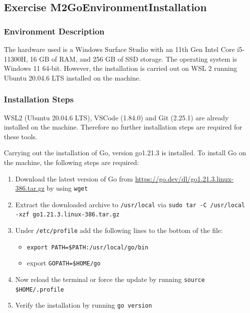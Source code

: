 \label{sec:exercise_install_go_env}

\subsection{Exercise M2GoEnvironmentInstallation}
\label{sec:exercise_m2go_environment_installation}

\subsubsection*{Environment Description}
The hardware used is a Windows Surface Studio with an 11th Gen Intel Core i5-11300H, 16 GB of RAM, and 256 GB of SSD storage.
The operating system is Windows 11 64-bit. However, the installation is carried out on WSL 2 running Ubuntu 20.04.6 LTS installed on the machine.

\subsubsection*{Installation Steps}
WSL2 (Ubuntu 20.04.6 LTS), VSCode (1.84.0) and Git (2.25.1) are already installed on the machine. Therefore no further installation steps are required for these tools.

Carrying out the installation of Go, version go1.21.3 is installed.
To install Go on the machine, the following steps are required:
\begin{enumerate}
    \item Download the latest version of Go from \url{https://go.dev/dl/go1.21.3.linux-386.tar.gz} by using  \texttt{wget}
    \item Extract the downloaded archive to \texttt{/usr/local} via \texttt{sudo tar -C /usr/local -xzf go1.21.3.linux-386.tar.gz}
    \item Under \texttt{/etc/profile} add the following lines to the bottom of the file: 
    \begin{itemize}
        \item \texttt{export PATH=\$PATH:/usr/local/go/bin}
        \item export \texttt{GOPATH=\$HOME/go}
    \end{itemize}
    \item Now reload the terminal or force the update by running \texttt{source \$HOME/.profile}
    \item Verify the installation by running \texttt{go version}
\end{enumerate}

